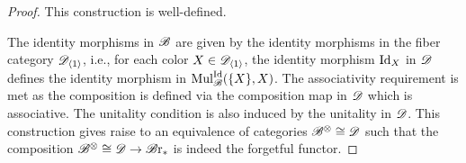 \begin{proof}
    This construction is well-defined. 

     




    The identity morphisms in $\mathscr{B}$ are given by the identity morphisms in the
    fiber category $\mathscr{D}_{\langle 1 \rangle}$, i.e., for each color $X \in
    \mathscr{D}_{\langle 1 \rangle}$, the identity morphism $\operatorname{Id}_X$ in $\mathscr{D}$ defines the
    identity morphism in $\operatorname{Mul}_{\mathscr{B}}^{\operatorname{Id}}(\{X\}, X)$. The associativity
    requirement is met as the composition is defined via the composition map in
    $\mathscr{D}$ which is associative. The unitality condition is also induced by the
    unitality in $\mathscr{D}$. This construction gives raise to an equivalence of
    categories $\mathscr{B}^{\otimes} \cong \mathscr{D}$ such that the composition $\mathscr{B}^{\otimes} \cong \mathscr{D} \to \mathscr{B} \text{r}_{\ast}$
    is indeed the forgetful functor.
\end{proof}


